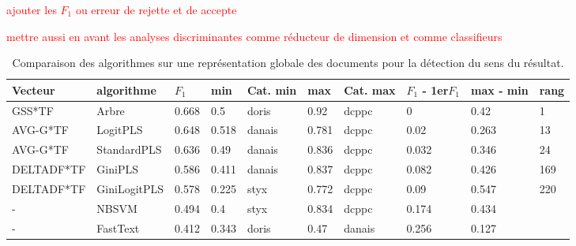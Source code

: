 \begin{table}[!htb]	
	\scriptsize
	
	\textcolor{red}{ajouter les $F_1$ ou erreur de rejette et de accepte}
	
	\textcolor{red}{mettre aussi en avant les analyses discriminantes comme réducteur de dimension et comme classifieurs}
	
	\centering
	\begin{tabular}{|l|l|l|l|l|l|l|l|l|l|}
		\hline
		\textbf{Vecteur} & \textbf{algorithme} & \textbf{$F_1$} & \textbf{min} & \textbf{Cat. min} & \textbf{max} & \textbf{Cat. max} & \textbf{$F_1$ - 1er$F_1$} & \textbf{max - min} & \textbf{rang} \\ \hline
		GSS*TF           & Arbre               & 0.668       & 0.5          & doris             & 0.92         & dcppc             & 0                   & 0.42               & 1             \\ \hline
		AVG-G*TF         & LogitPLS            & 0.648       & 0.518        & danais            & 0.781        & dcppc             & 0.02                & 0.263              & 13            \\ \hline
		AVG-G*TF         & StandardPLS         & 0.636       & 0.49         & danais            & 0.836        & dcppc             & 0.032               & 0.346              & 24            \\ \hline
		DELTADF*TF       & GiniPLS             & 0.586       & 0.411        & danais            & 0.837        & dcppc             & 0.082               & 0.426              & 169           \\ \hline
		DELTADF*TF       & GiniLogitPLS        & 0.578       & 0.225        & styx              & 0.772        & dcppc             & 0.09                & 0.547              & 220           \\ \hline
		-                & NBSVM               & 0.494       & 0.4          & styx              & 0.834        & dcppc             & 0.174               & 0.434              &               \\ \hline
		-                & FastText            & 0.412       & 0.343        & doris             & 0.47         & danais            & 0.256               & 0.127              &               \\ \hline
	\end{tabular}
\caption{Comparaison des algorithmes sur une représentation globale des documents pour la détection du sens du résultat.}\label{tab:sensrst:global}
\end{table}

